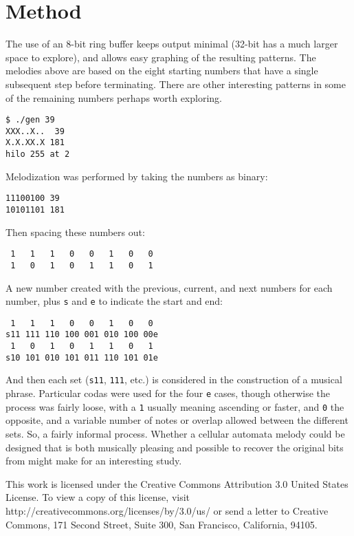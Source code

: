 \documentclass[a4paper,10pt,twoside,onecolumn,openany,final]{memoir}
\begin{document}
\chapter*{Method}

The use of an 8-bit ring buffer keeps output minimal (32-bit has a much larger space to explore), and allows easy graphing of the resulting patterns. The melodies above are based on the eight starting numbers that have a single subsequent step before terminating. There are other interesting patterns in some of the remaining numbers perhaps worth exploring. \\

\begin{verbatim}
$ ./gen 39
XXX..X..  39
X.X.XX.X 181
hilo 255 at 2
\end{verbatim}

Melodization was performed by taking the numbers as binary:

\begin{verbatim}
11100100 39
10101101 181
\end{verbatim}

Then spacing these numbers out:

\begin{verbatim}
 1   1   1   0   0   1   0   0
 1   0   1   0   1   1   0   1
\end{verbatim}

A new number created with the previous, current, and next numbers for each number, plus \texttt{s} and \texttt{e} to indicate the start and end:

\begin{verbatim}
 1   1   1   0   0   1   0   0
s11 111 110 100 001 010 100 00e
 1   0   1   0   1   1   0   1
s10 101 010 101 011 110 101 01e
\end{verbatim}

And then each set (\texttt{s11}, \texttt{111}, etc.) is considered in the construction of a musical phrase. Particular codas\citep[p.29]{taruskin2010} were used for the four \texttt{e} cases, though otherwise the process was fairly loose, with a \texttt{1} usually meaning ascending or faster, and \texttt{0} the opposite, and a variable number of notes or overlap allowed between the different sets. So, a fairly informal process. Whether a cellular automata melody\citep[p.600]{stephenson2008} could be designed that is both musically pleasing and possible to recover the original bits from might make for an interesting study.

\vfill

This work is licensed under the Creative Commons Attribution 3.0 United States License. To view a copy of this license, visit http://creativecommons.org/licenses/by/3.0/us/ or send a letter to Creative Commons, 171 Second Street, Suite 300, San Francisco, California, 94105.


\end{document}
